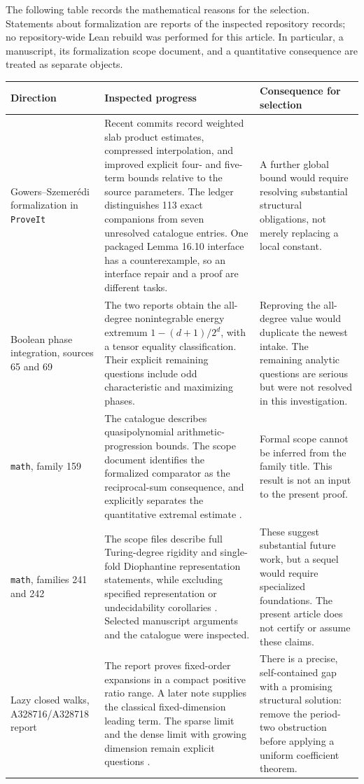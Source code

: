 \documentclass[11pt,letterpaper]{article}
\theoremstyle{remark}\newtheorem{remark}[theorem]{Remark}
\newcommand{\repo}{\texttt{ProveIt}}
\begin{document}
The following table records the mathematical reasons for the selection.
Statements about formalization are reports of the inspected repository
records; no repository-wide Lean rebuild was performed for this article.
In particular, a manuscript, its formalization scope document, and a
quantitative consequence are treated as separate objects.

\begin{longtable}{@{}>{\raggedright\arraybackslash}p{}>{\raggedright\arraybackslash}p{}>{\raggedright\arraybackslash}p{}@{}}%
\toprule
Direction & Inspected progress & Consequence for selection\\
\midrule
\endhead
Gowers--Szemer\'edi formalization in \repo
& Recent commits record weighted slab product estimates, compressed
interpolation, and improved explicit four- and five-term bounds relative
to the source parameters. The ledger distinguishes 113 exact companions
from seven unresolved catalogue entries. One packaged Lemma 16.10
interface has a counterexample, so an interface repair and a proof are
different tasks.
& A further global bound would require resolving substantial structural
obligations, not merely replacing a local constant.\\[4pt]
Boolean phase integration, sources 65 and 69
& The two reports obtain the all-degree nonintegrable energy extremum
$1-(d+1)/2^d$, with a tensor equality classification. Their explicit
remaining questions include odd characteristic and maximizing phases.
& Reproving the all-degree value would duplicate the newest intake.
The remaining analytic questions are serious but were not resolved in
this investigation.\\[4pt]
\texttt{math}, family 159
& The catalogue describes quasipolynomial arithmetic-progression bounds.
The scope document identifies the formalized comparator as the
reciprocal-sum consequence, and explicitly separates the quantitative
extremal estimate \cite{math159}.
& Formal scope cannot be inferred from the family title. This result is
not an input to the present proof.\\[4pt]
\texttt{math}, families 241 and 242
& The scope files describe full Turing-degree rigidity and single-fold
Diophantine representation statements, while excluding specified
representation or undecidability corollaries \cite{math241,math242}.
Selected manuscript arguments and the catalogue were inspected.
& These suggest substantial future work, but a sequel would require
specialized foundations. The present article does not certify or assume
these claims.\\[4pt]
Lazy closed walks, A328716/A328718 report
& The report proves fixed-order expansions in a compact positive ratio
range. A later note supplies the classical fixed-dimension leading term.
The sparse limit and the dense limit with growing dimension remain
explicit questions \cite{lcw}.
& There is a precise, self-contained gap with a promising structural
solution: remove the period-two obstruction before applying a uniform
coefficient theorem.\\
\bottomrule
\end{longtable}
\end{document}
